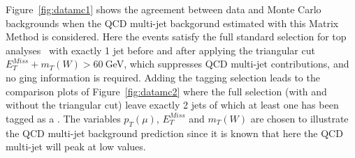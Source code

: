 Figure~\ref{fig:datamc1} shows the agreement between data and Monte Carlo 
backgrounds 
when the QCD multi-jet backgorund estimated with this Matrix Method 
is considered. Here the events satisfy the full standard 
selection for top analyses~\cite{topCommonObjects2012} with 
exactly 1 jet before and after applying the triangular cut 
$E_T^{Miss} + m_T(W)>60~$GeV, which suppresses QCD multi-jet
contributions, and no \btag ging information is 
required. Adding the tagging selection leads to the comparison 
plots of Figure~\ref{fig:datamc2} where the full selection (with 
and without the triangular cut) leave exactly 2 jets of which at 
least one has been tagged as a \bjet. The variables $p_T(\mu)$, 
$E_T^{Miss}$ and $m_T(W)$ are chosen to illustrate the QCD multi-jet 
background prediction since it is known that here the QCD multi-jet will peak at 
low values. 



